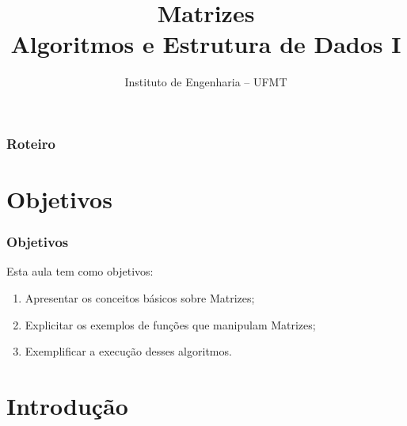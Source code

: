 \documentclass[aspectratio=169]{beamer}
\title[Matrizes]{Matrizes\\
   Algoritmos e Estrutura de Dados I}
\author[IEng - UFMT]{Instituto de Engenharia -- UFMT}
\date{}
\begin{document}
\begin{frame}[plain]
  \titlepage
\end{frame}


\begin{frame}
\frametitle{Roteiro} %
\tableofcontents %
\end{frame}


\section{Objetivos}

\begin{frame}
\frametitle{Objetivos}
Esta aula tem como objetivos:

\begin{enumerate}
\item Apresentar os conceitos básicos sobre Matrizes;
\item Explicitar os exemplos de funções que manipulam Matrizes;
\item Exemplificar a execução desses algoritmos.
\end{enumerate}
\end{frame}


\section{Introdução} %
\end{document}
